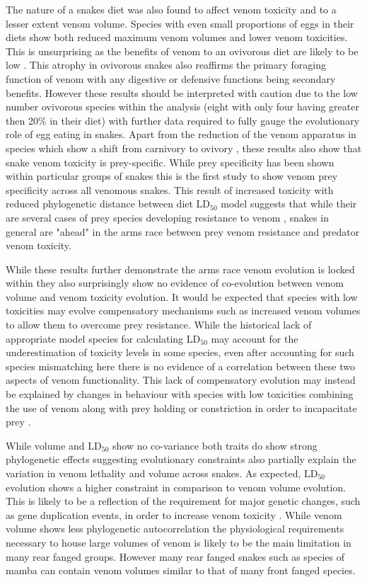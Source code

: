 The nature of a snakes diet was also found to affect venom toxicity and to a lesser extent venom volume. Species with even small proportions of eggs in their diets show both reduced maximum venom volumes and lower venom toxicities. This is unsurprising as the benefits of venom to an ovivorous diet are likely to be low \citep{li2005eggs}. This atrophy in ovivorous snakes also reaffirms the primary foraging function of venom with any digestive \citep{rodriguez1992venom} or defensive functions \citep{jansa2011adaptive} being secondary benefits. However these results should be interpreted with caution due to the low number ovivorous species within the analysis (eight with only four having greater then 20\% in their diet) with further data required to fully gauge the evolutionary role of egg eating in snakes. Apart from the reduction of the venom apparatus in species which show a shift from carnivory to ovivory \citep{li2005eggs}, these results also show that snake venom toxicity is prey-specific. While prey specificity has been shown within particular groups of snakes \citep{barlow2009coevolution,barlow2009coevolution,richards2012venom} this is the first study to show venom prey specificity across all venomous snakes. This result of increased toxicity with reduced phylogenetic distance between diet LD$_{50}$ model suggests that while their are several cases of prey species developing resistance to venom \citep{lillywhite2002patterns}, snakes in general are "ahead" in the arms race between prey venom resistance and predator venom toxicity.


While these results further demonstrate the arms race venom evolution is locked within they also surprisingly show no evidence of co-evolution between venom volume and venom toxicity evolution. It would be expected that species with low toxicities may evolve compensatory mechanisms such as increased venom volumes to allow them to overcome prey resistance. While the historical lack of appropriate model species for calculating LD$_{50}$ may account for the underestimation of toxicity levels in some species, even after accounting for such species mismatching here there is no evidence of a correlation between these two aspects of venom functionality. This lack of compensatory evolution may instead be explained by changes in behaviour with species with low toxicities combining the use of venom along with prey holding or constriction in order to incapacitate prey \cite{shine1985prey}.


While volume and LD$_{50}$ show no co-variance both traits do show strong phylogenetic effects suggesting evolutionary constraints also partially explain the variation in venom lethality and volume across snakes. As expected, LD$_{50}$ evolution shows a higher constraint in comparison to venom volume evolution. This is likely to be a reflection of the requirement for major genetic changes, such as gene duplication events, in order to increase venom toxicity \citep{vonk2013king}. While venom volume shows less phylogenetic autocorrelation the physiological requirements necessary to house large volumes of venom is likely to be the main limitation in many rear fanged groups. However many rear fanged snakes such as species of mamba can contain venom volumes similar to that of many front fanged species.


